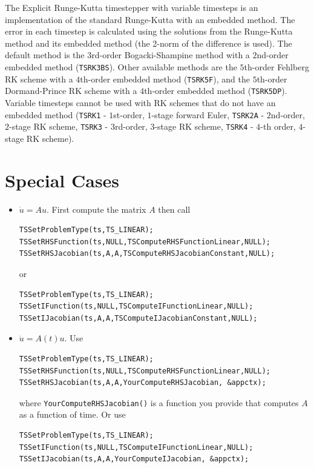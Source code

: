 The Explicit Runge-Kutta timestepper with variable timesteps is an 
implementation of the standard Runge-Kutta with an embedded method. The error in each
timestep is calculated using the solutions from the Runge-Kutta method and its embedded
method (the 2-norm of the difference is used). The default method is the 
$3$rd-order Bogacki-Shampine method with a $2$nd-order embedded method (\lstinline{TSRK3BS}).
Other available methods are the  $5$th-order Fehlberg RK scheme with a $4$th-order embedded
method (\lstinline{TSRK5F}), and the  $5$th-order Dormand-Prince RK scheme with a $4$th-order embedded method
(\lstinline{TSRK5DP}). Variable timesteps cannot be used with RK schemes that do not have an embedded
method (\lstinline{TSRK1} - $1$st-order, $1$-stage forward Euler, \lstinline{TSRK2A} - $2$nd-order, $2$-stage RK scheme,
\lstinline{TSRK3} - $3$rd-order, $3$-stage RK scheme, \lstinline{TSRK4} - $4$-th order, $4$-stage RK scheme).

\section{Special Cases}

\begin{itemize}
\item $ \dot{u} = A u.$ First compute the matrix $ A$ then call
\begin{lstlisting}
TSSetProblemType(ts,TS_LINEAR);
TSSetRHSFunction(ts,NULL,TSComputeRHSFunctionLinear,NULL); 
TSSetRHSJacobian(ts,A,A,TSComputeRHSJacobianConstant,NULL);
\end{lstlisting}
or
\begin{lstlisting}
TSSetProblemType(ts,TS_LINEAR);
TSSetIFunction(ts,NULL,TSComputeIFunctionLinear,NULL); 
TSSetIJacobian(ts,A,A,TSComputeIJacobianConstant,NULL);
\end{lstlisting}

\item $ \dot{u} = A(t) u.$ Use
\begin{lstlisting}
TSSetProblemType(ts,TS_LINEAR);
TSSetRHSFunction(ts,NULL,TSComputeRHSFunctionLinear,NULL); 
TSSetRHSJacobian(ts,A,A,YourComputeRHSJacobian, &appctx);
\end{lstlisting}
where {\tt YourComputeRHSJacobian()} is a function you provide that computes $A$ as a function of time. Or use
\begin{lstlisting}
TSSetProblemType(ts,TS_LINEAR);
TSSetIFunction(ts,NULL,TSComputeIFunctionLinear,NULL); 
TSSetIJacobian(ts,A,A,YourComputeIJacobian, &appctx);
\end{lstlisting}

\end{itemize}

